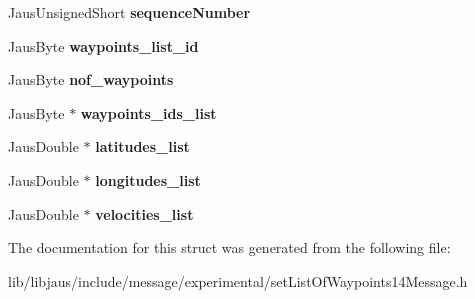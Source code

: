 \begin{DoxyCompactItemize}
\item 
\hypertarget{struct_set_list_of_waypoints14_message_struct_a5b9fab0970b30b2403b9b38388f75828}{\-Jaus\-Unsigned\-Short {\bfseries sequence\-Number}}\label{struct_set_list_of_waypoints14_message_struct_a5b9fab0970b30b2403b9b38388f75828}

\item 
\hypertarget{struct_set_list_of_waypoints14_message_struct_ae50ad858a2a2ca7bfa5e6f0806f94def}{\-Jaus\-Byte {\bfseries waypoints\-\_\-list\-\_\-id}}\label{struct_set_list_of_waypoints14_message_struct_ae50ad858a2a2ca7bfa5e6f0806f94def}

\item 
\hypertarget{struct_set_list_of_waypoints14_message_struct_a3bdcee2bc2f7d14789bc3a9945af9f58}{\-Jaus\-Byte {\bfseries nof\-\_\-waypoints}}\label{struct_set_list_of_waypoints14_message_struct_a3bdcee2bc2f7d14789bc3a9945af9f58}

\item 
\hypertarget{struct_set_list_of_waypoints14_message_struct_a833585ea45673887089bee09a7b7b474}{\-Jaus\-Byte $\ast$ {\bfseries waypoints\-\_\-ids\-\_\-list}}\label{struct_set_list_of_waypoints14_message_struct_a833585ea45673887089bee09a7b7b474}

\item 
\hypertarget{struct_set_list_of_waypoints14_message_struct_ab0e6286e53ff5614bcb5f2d70cb53835}{\-Jaus\-Double $\ast$ {\bfseries latitudes\-\_\-list}}\label{struct_set_list_of_waypoints14_message_struct_ab0e6286e53ff5614bcb5f2d70cb53835}

\item 
\hypertarget{struct_set_list_of_waypoints14_message_struct_aee3b4786cff8a6a8d34c7cb4ab4d6232}{\-Jaus\-Double $\ast$ {\bfseries longitudes\-\_\-list}}\label{struct_set_list_of_waypoints14_message_struct_aee3b4786cff8a6a8d34c7cb4ab4d6232}

\item 
\hypertarget{struct_set_list_of_waypoints14_message_struct_acea87d196857fc234887f2cc064e4f7c}{\-Jaus\-Double $\ast$ {\bfseries velocities\-\_\-list}}\label{struct_set_list_of_waypoints14_message_struct_acea87d196857fc234887f2cc064e4f7c}

\end{DoxyCompactItemize}


\-The documentation for this struct was generated from the following file\-:\begin{DoxyCompactItemize}
\item 
lib/libjaus/include/message/experimental/set\-List\-Of\-Waypoints14\-Message.\-h\end{DoxyCompactItemize}
